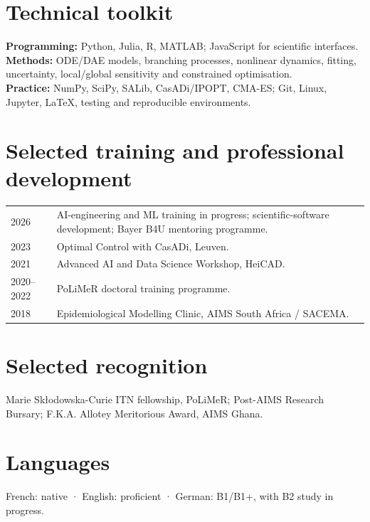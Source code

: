 \section{Technical toolkit}
\textbf{Programming:} Python, Julia, R, MATLAB; JavaScript for scientific interfaces.\\
\textbf{Methods:} ODE/DAE models, branching processes, nonlinear dynamics, fitting, uncertainty, local/global sensitivity and constrained optimisation.\\
\textbf{Practice:} NumPy, SciPy, SALib, CasADi/IPOPT, CMA-ES; Git, Linux, Jupyter, LaTeX, testing and reproducible environments.
\section{Selected training and professional development}
\begin{tabularx}{\linewidth}{@{}p{24mm}X@{}}
2026 & AI-engineering and ML training in progress; scientific-software development; Bayer B4U mentoring programme.\\[5pt]
2023 & Optimal Control with CasADi, Leuven.\\[5pt]
2021 & Advanced AI and Data Science Workshop, HeiCAD.\\[5pt]
2020–2022 & PoLiMeR doctoral training programme.\\[5pt]
2018 & Epidemiological Modelling Clinic, AIMS South Africa / SACEMA.
\end{tabularx}
\section{Selected recognition}
Marie Skłodowska-Curie ITN fellowship, PoLiMeR; Post-AIMS Research Bursary; F.K.A. Allotey Meritorious Award, AIMS Ghana.
\section{Languages}
French: native · English: proficient · German: B1/B1+, with B2 study in progress.



